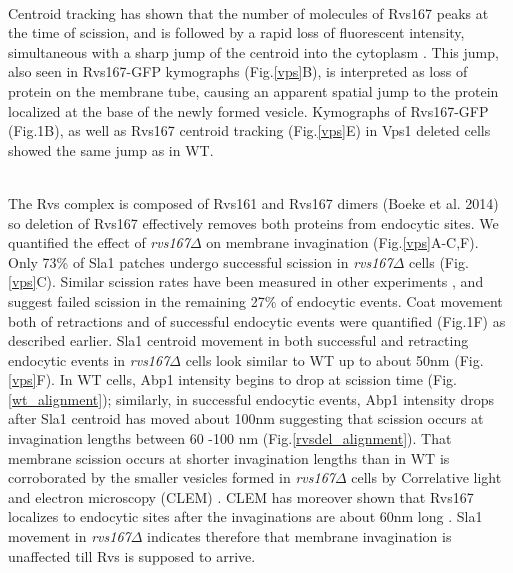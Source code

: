 \documentclass[9pt,lineno]{elife}
\begin{document}
~\\
Centroid tracking has shown that the number of molecules of Rvs167 peaks at the time of  scission, and is followed by a rapid loss of fluorescent intensity, simultaneous with a sharp jump of the centroid into the cytoplasm \citep{Picco2015}. This jump, also seen in Rvs167-GFP kymographs (Fig.\ref{vps}B), is interpreted as loss of protein on the membrane tube, causing an apparent spatial jump to the protein localized at the base of the newly formed vesicle. Kymographs of Rvs167-GFP (Fig.1B), as well as Rvs167 centroid tracking (Fig.\ref{vps}E) in Vps1 deleted cells showed the same jump as in WT. 

~\\
The Rvs complex is composed of Rvs161 and Rvs167 dimers (Boeke et al. 2014) so deletion of Rvs167 effectively removes both proteins from endocytic sites. We quantified the effect of \textit{rvs167$\Delta$}  on membrane invagination (Fig.\ref{vps}A-C,F). Only 73\% of Sla1 patches undergo successful scission in \textit{rvs167$\Delta$}  cells (Fig.\ref{vps}C). Similar scission rates have been measured in other experiments \citep{Kaksonen2005}, and suggest failed scission in the remaining 27\% of endocytic events. Coat movement both of retractions and of successful endocytic events were quantified (Fig.1F) as described earlier. Sla1 centroid movement in both successful and retracting endocytic events in \textit{rvs167$\Delta$}  cells look similar to WT up to about 50nm (Fig.\ref{vps}F). In WT cells, Abp1 intensity begins to drop at scission time (Fig.\ref{wt_alignment}); similarly, in successful endocytic events, Abp1 intensity drops after Sla1 centroid has moved about 100nm suggesting that scission occurs at invagination lengths between 60 -100 nm (Fig.\ref{rvsdel_alignment}). That membrane scission occurs at shorter invagination lengths than in WT is corroborated  by the smaller vesicles formed in \textit{rvs167$\Delta$}  cells by Correlative light and electron microscopy (CLEM) \citep{Kukulski2012}. CLEM has moreover shown that Rvs167 localizes to endocytic sites after the invaginations are about 60nm long \citep{Kukulski2012}. Sla1 movement in \textit{rvs167$\Delta$} indicates therefore that membrane invagination is unaffected till Rvs is supposed to arrive. 


\end{document}

